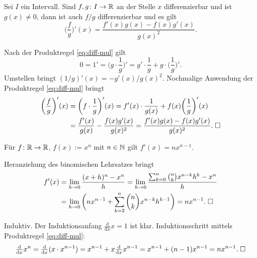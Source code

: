 \newpage
\begin{Satz}
Sei $I$ ein Intervall. Sind $f,g\colon I\to\mathbb R$ an der Stelle
$x$ differenzierbar und ist $g(x)\ne 0$, dann
ist auch $f/g$ differenzierbar und es gilt
\begin{equation}
\bigg(\frac{f}{g}\bigg)'(x) = \frac{f'(x)g(x)-f(x)g'(x)}{g(x)^2}.
\end{equation}
\end{Satz}
\begin{Beweis}
Nach der Produktregel \eqref{eq:diff-mul} gilt
\begin{equation}
0 = 1' = \bigg(g\cdot\frac{1}{g}\bigg)'
= g'\cdot\frac{1}{g}+g\cdot \bigg(\frac{1}{g}\bigg)'.
\end{equation}
Umstellen bringt $(1/g)'(x)=-g'(x)/g(x)^2$. Nochmalige Anwendung der
Produktregel \eqref{eq:diff-mul} bringt
\begin{align}
\bigg(\frac{f}{g}\bigg)'(x)
&= \bigg(f\cdot\frac{1}{g}\bigg)'(x)
= f'(x)\cdot\frac{1}{g(x)}+f(x)\bigg(\frac{1}{g}\bigg)'(x)\\
&= \frac{f'(x)}{g(x)}-\frac{f(x)g'(x)}{g(x)^2}
= \frac{f'(x)g(x)-f(x)g'(x)}{g(x)^2}.\;\square
\end{align}
\end{Beweis}

\begin{Satz}\label{diff-power}
Für $f\colon\mathbb R\to\mathbb R$, $f(x):=x^n$ mit $n\in\mathbb N$ gilt
$f'(x)=nx^{n-1}$.
\end{Satz}
\begin{Beweis}[Beweis 1]
Heranziehung des binomischen Lehrsatzes bringt
\begin{align}
f'(x) &= \lim_{h\to 0}\frac{(x+h)^n-x^n}{h}
= \lim_{h\to 0}\frac{\sum_{k=0}^n\binom{n}{k}x^{n-k} h^k-x^n}{h}\\
&= \lim_{h\to 0}\bigg(nx^{n-1}+\sum_{k=2}^n\binom{n}{k}x^{n-k}h^{k-1}\bigg)
= nx^{n-1}.\;\square
\end{align}
\end{Beweis}
\begin{Beweis}[Beweis 2]
Induktiv. Der Induktionsanfang $\tfrac{\mathrm d}{\mathrm dx}x=1$ ist klar.
Induktionsschritt mittels Produktregel \eqref{eq:diff-mul}:
\begin{align}
\tfrac{\mathrm d}{\mathrm dx} x^n = \tfrac{\mathrm d}{\mathrm dx} (x\cdot x^{n-1})
= x^{n-1}+x\tfrac{\mathrm d}{\mathrm dx}x^{n-1}
= x^{n-1}+(n-1)x^{n-1} = nx^{n-1}.\;\square
\end{align}
\end{Beweis}


